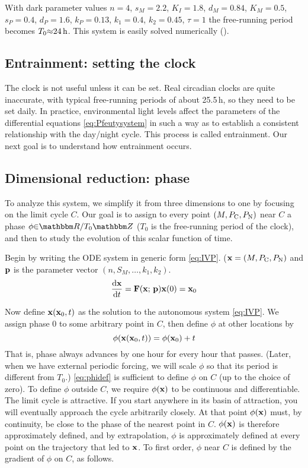 With dark parameter values $n=4$, ${s}_{M}=2.2$, ${K}_{I}=1.8$, 
${d}_{M}=0.84$, ${K}_{M}=0.5$, ${s}_{P}=0.4$, ${d}_{P}=1.6$, 
${k}_{P}=0.13$, ${k}_{1}=0.4$, ${k}_{2}=0.45$, $\tau =1$ the
free-running period becomes ${T}_{0}{\approx}\unit[24]{h}$. This system is
easily solved numerically (). 

\subsection{Entrainment: setting the clock}
The clock is not useful unless it can be set. Real circadian clocks
are quite inaccurate, with typical free-running periods of about
25.5\,h, so they need to be set daily. In practice, environmental
light levels affect the parameters of the differential equations \eqref{eq:Pfeutysystem} in
such a way as to establish a consistent relationship with the
day/night cycle. This process is called entrainment. Our next goal is
to understand how entrainment occurs. 

\subsection{Dimensional reduction: phase}
To analyze this system, we simplify it from three dimensions to one by
focusing on the limit cycle $C$. Our goal is to assign to every
point $(M,P_{\text{C}},P_{\text{N}})$ near $C$ a phase $\phi{\in}\R/{T}_{0}\Z$
(${T}_{0}$ is the free-running period of the clock), and then to study
the evolution of this scalar function of time. 

Begin by writing the ODE system in generic form
\eqref{eq:IVP}. ($\vb{x}=(M,P_{\text{C}},P_{\text{N}})$ and $\vb{p}$ is the parameter vector
$(n,{S}_{M},{\dots},{k}_{1},{k}_{2})$.  
\begin{equation}\label{eq:IVP}
\dv{\vb{x}}{t}=\vb{F}(\vb{x};\,\vb{p})
\vb{x}(0)={\vb{x}}_{0}
\end{equation}

Now define $\vb{x}({\vb{x}}_{0},t)$ as the solution to the autonomous system
\eqref{eq:IVP}. We assign phase 0 to some arbitrary point in $C$, then define 
$\phi$ at other locations by 
\begin{equation}\label{eq:phidef}
\phi (\vb{x}({\vb{x}}_{0},t))=\phi
({\vb{x}}_{0})+t
\end{equation}
That is, phase always advances by one hour for every hour that passes.
(Later, when we have external periodic forcing, we will scale 
$\phi$ so that its period is different from ${T}_{0}$.) \eqref{eq:phidef} is
sufficient to define $\phi$ on $C$ (up to the choice of zero).
To define $\phi$ outside $C$, we require $\phi(\vb{x})$ to be
continuous and differentiable. The limit cycle is attractive. If you
start anywhere in its basin of attraction, you will eventually
approach the cycle arbitrarily closely. At that point $\phi(\vb{x})$
must, by continuity, be close to the phase of the nearest point in 
$C$. $\phi(\vb{x})$ is therefore approximately defined, and by
extrapolation, $\phi$ is approximately defined at every point on
the trajectory that led to $\vb{x}$. To first order, $\phi$ near 
$C$ is defined by the gradient of $\phi$ on $C$, as follows. 


